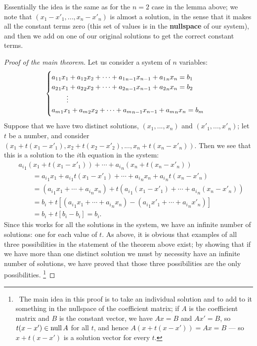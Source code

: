 \documentclass[a4paper,leqno]{article}
\numberwithin{equation}{section}
\theoremstyle{definition}
\theoremstyle{remark}
\newcommand{\df}[1]{\textbf{#1}}
\begin{document}
Essentially the idea is the same as for the $ n = 2 $ case in the lemma above; we note that $ (x_1 - x'_1, ..., x_n - x'_n) $ is almost a solution,
in the sense that it makes all the constant terms zero (this set of values is in the \df{nullspace} of our system), and then we add on one of our original
solutions to get the correct constant terms.

\begin{proof}[Proof of the main theorem]
  Let us consider a system of $ n $ variables:
  \begin{equation}
    \begin{cases}
      {a_1}_1 x_1 + {a_1}_2 x_2 + \cdots + {a_1}_{n - 1} x_{n - 1} + {a_1}_n x_n = b_1\\
      {a_2}_1 x_1 + {a_2}_2 x_2 + \cdots + {a_2}_{n - 1} x_{n - 1} + {a_2}_n x_n = b_2\\
        \hspace{0.15em}\qquad\vdots\\
      {a_m}_1 x_1 + {a_m}_2 x_2 + \cdots + {a_m}_{n - 1} x_{n - 1} + {a_m}_n x_n = b_m
    \end{cases}
  \end{equation}
  Suppose that we have two distinct solutions, $ (x_1, ..., x_n) $ and $ (x'_1, ..., x'_n) $; let $ t $ be a number, and consider
  $ (x_1 + t(x_1 - x'_1), x_2 + t(x_2 - x'_2), ..., x_n + t(x_n - x'_n)) $. Then we see that this is a solution to the $ i$th equation
  in the system:
  \begin{align*}
    &{a_i}_1 (x_1 + t(x_1 - x'_1)) + \cdots + {a_i}_n (x_n + t(x_n - x'_n))\\
    &\qquad = {a_i}_1 x_1 + {a_i}_1 t(x_1 - x'_1) + \cdots + {a_i}_n x_n + {a_i}_n t(x_n - x'_n)\\
    &\qquad = ({a_i}_1 x_1 + \cdots + {a_i}_n x_n) + t({a_i}_1 (x_1 - x'_1) + \cdots + {a_i}_n (x_n - x'_n))\\
    &\qquad = b_i + t[({a_i}_1 x_1 + \cdots + {a_i}_n x_n) - ({a_i}_1 x'_1 + \cdots + {a_i}_n x'_n)]\\
    &\qquad = b_i + t[b_i - b_i] = b_i.
  \end{align*}
  Since this works for all the solutions in the system, we have an infinite number of solutions: one for each value of $ t $. As above, it is obvious
  that examples of all three possibilities in the statement of the theorem above exist; by showing that if we have more than one distinct solution we
  must by necessity have an infinite number of solutions, we have proved that those three possibilities are the only possibilities.
  \footnote{~The main idea in this proof is to take an individual solution and to add to it something in the nullspace of the coefficient matrix;
  if $ A $ is the coefficient matrix and $ B $ is the constant vector, we have $ Ax = B $ and $ Ax' = B $, so $ t(x - x') \in \mathrm{null}\thinspace A $
  for all $ t $, and hence $ A(x + t(x - x')) = Ax = B $ --- so $ x + t(x - x') $ is a solution vector for every $ t $.}
\end{proof}
\end{document}
